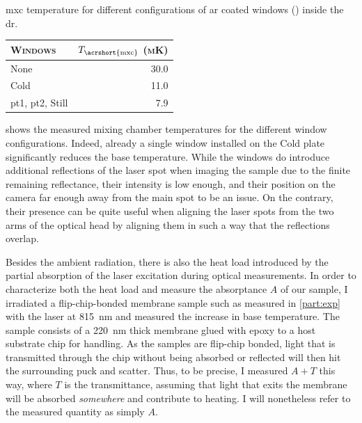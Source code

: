 \begin{margintable}
    \centering
    \footnotesize
    \caption{
        \Gls{mxc} temperature for different configurations of \gls{ar} coated windows (\thewindow) inside the \gls{dr}.
    }
    \label{tab:setup:cooling:windows}
    \begin{tabular}{lr}
        \toprule
        \textsc{Windows}                      & $T_\mathrm{\acrshort{mxc}}$ \textsc{(mK)} \\
        \midrule
        None                                  & 30.0                                      \\
        Cold                                  & 11.0                                      \\
        \acrshort{pt1}, \acrshort{pt2}, Still & 7.9                                       \\
        \bottomrule
    \end{tabular}
\end{margintable}

 shows the measured mixing chamber temperatures for the different window configurations.
Indeed, already a single window installed on the Cold plate significantly reduces the base temperature.
While the windows do introduce additional reflections of the laser spot when imaging the sample due to the finite remaining reflectance, their intensity is low enough, and their position on the camera far enough away from the main spot to be an issue.
On the contrary, their presence can be quite useful when aligning the laser spots from the two arms of the optical head by aligning them in such a way that the reflections overlap.

Besides the ambient radiation, there is also the heat load introduced by the partial absorption of the laser excitation during optical measurements.
In order to characterize both the heat load and measure the absorptance $A$ of our sample, I irradiated a flip-chip-bonded membrane sample such as measured in \cref{part:exp} with the laser at \qty{815}{\nano\meter} and measured the increase in base temperature.
The sample consists of a \qty{220}{\nano\meter} thick \GaAsAlGaAs membrane glued with epoxy to a  host substrate chip for handling.
As the samples are flip-chip bonded, light that is transmitted through the chip without being absorbed or reflected will then hit the surrounding puck and scatter.
Thus, to be precise, I measured $A+T$ this way, where $T$ is the transmittance, assuming that light that exits the membrane will be absorbed \emph{somewhere} and contribute to heating.
I will nonetheless refer to the measured quantity as simply $A$.

